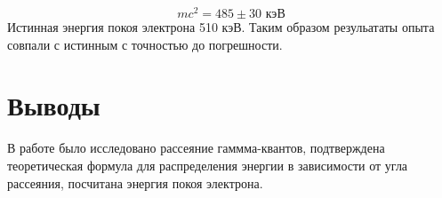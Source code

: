 \documentclass[a4paper, 12pt]{article}
\begin{document}
\begin{equation}
	mc^2 = 485 \pm 30 \text{ кэВ}
\end{equation}
Истинная энергия покоя электрона 510 кэВ. Таким образом резульататы опыта совпали с истинным с точностью до погрешности.

\section{Выводы}

В работе было исследовано рассеяние гаммма-квантов, подтверждена теоретическая формула для распределения энергии в зависимости от угла рассеяния, посчитана энергия покоя электрона.
\end{document}
